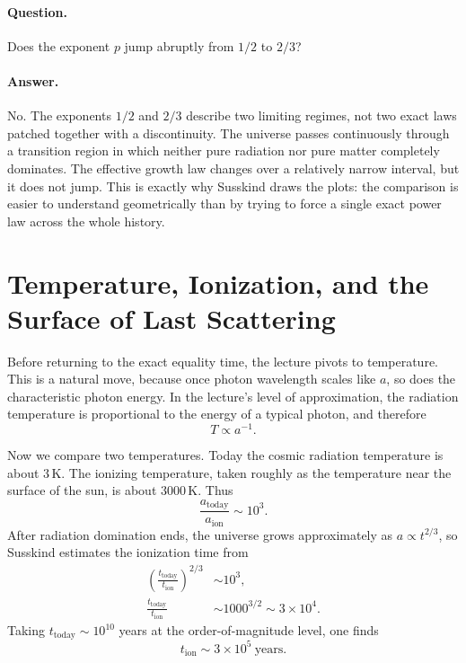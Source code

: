 \paragraph{Question.} Does the exponent \(p\) jump abruptly from \(1/2\) to \(2/3\)?

\paragraph{Answer.} No. The exponents \(1/2\) and \(2/3\) describe two limiting regimes, not two exact laws patched together with a discontinuity. The universe passes continuously through a transition region in which neither pure radiation nor pure matter completely dominates. The effective growth law changes over a relatively narrow interval, but it does not jump. This is exactly why Susskind draws the plots: the comparison is easier to understand geometrically than by trying to force a single exact power law across the whole history.

\section{Temperature, Ionization, and the Surface of Last Scattering}

Before returning to the exact equality time, the lecture pivots to temperature. This is a natural move, because once photon wavelength scales like \(a\), so does the characteristic photon energy. In the lecture's level of approximation, the radiation temperature is proportional to the energy of a typical photon, and therefore
\begin{equation}
T\propto a^{-1}.
\end{equation}

Now we compare two temperatures. Today the cosmic radiation temperature is about \(3\,\mathrm{K}\). The ionizing temperature, taken roughly as the temperature near the surface of the sun, is about \(3000\,\mathrm{K}\). Thus
\begin{equation}
\frac{a_{\mathrm{today}}}{a_{\mathrm{ion}}}\sim 10^3.
\end{equation}
After radiation domination ends, the universe grows approximately as \(a\propto t^{2/3}\), so Susskind estimates the ionization time from
\begin{align}
\left(\frac{t_{\mathrm{today}}}{t_{\mathrm{ion}}}\right)^{2/3} &\sim 10^3,\\
\frac{t_{\mathrm{today}}}{t_{\mathrm{ion}}} &\sim 1000^{3/2}\sim 3\times 10^4.
\end{align}
Taking \(t_{\mathrm{today}}\sim 10^{10}\) years at the order-of-magnitude level, one finds
\begin{equation}
t_{\mathrm{ion}}\sim 3\times 10^5\ \mathrm{years}.
\end{equation}

